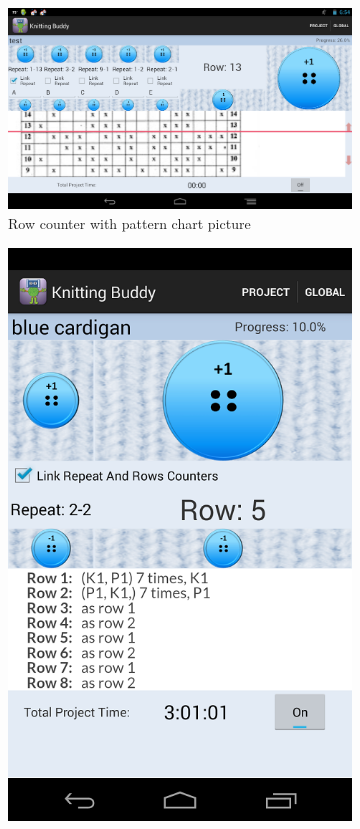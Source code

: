 \begin{figure}[H]
  \centering
    \begin{subfigure}[b]{0.5\textwidth}
      \centering
        \includegraphics[width=0.95\linewidth]{images/image04.png}
        \caption[Row counter with pattern chart picture ]{Row counter with pattern chart picture}
    \end{subfigure}
    \begin{subfigure}[b]{0.33\textwidth}
      \centering
        \includegraphics[width=0.95\linewidth]{images/image05.png}

\end{subfigure}
\end{figure}
